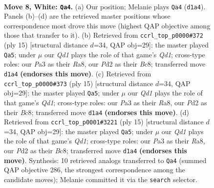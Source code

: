 \documentclass[11pt]{article}
\begin{document}
\begin{figure}[p]\centering
\begin{subfigure}{0.46\textwidth}\centering
\resizebox{\linewidth}{!}{%
\newchessgame
\chessboard[
  setfen={r1bq1rk1/pp1pppbp/2n3p1/2p4n/2P5/P1N2NP1/1P1PPPBP/R1BQ1RK1 w - - 1 8},
  showmover=false,
  pgfstyle=straightmove, color=movearrow, markmove={d1-a4}
]}
\caption{}
\end{subfigure}\hfill
\begin{subfigure}{0.46\textwidth}\centering
\resizebox{\linewidth}{!}{%
\newchessgame
\chessboard[
  setfen={r1bq1rk1/pp1pppbp/2n2np1/8/2PN4/2N3P1/PP2PPBP/R1BQ1RK1 b - - 6 8},
  showmover=false,
  pgfstyle=straightmove, color=movearrow, markmove={d8-a5}
]}
\caption{}
\end{subfigure}
\\[4pt]
\begin{subfigure}{0.46\textwidth}\centering
\resizebox{\linewidth}{!}{%
\newchessgame
\chessboard[
  setfen={r1bq1rk1/pp1pppbp/2n2np1/8/2PN4/2N3P1/PP2PPBP/R1BQ1RK1 b - - 6 8},
  showmover=false,
  pgfstyle=straightmove, color=movearrow, markmove={d8-a5}
]}
\caption{}
\end{subfigure}\hfill
\begin{subfigure}{0.46\textwidth}\centering
\resizebox{\linewidth}{!}{%
\newchessgame
\chessboard[
  setfen={r1bq1rk1/pp1pppbp/2n2np1/8/2PN4/2N3P1/PP2PPBP/R1BQ1RK1 b - - 4 8},
  showmover=false,
  pgfstyle=straightmove, color=movearrow, markmove={d8-a5}
]}
\caption{}
\end{subfigure}
\caption{\textbf{Move 8, White: \texttt{Qa4}.} (a) Our position; Melanie plays \texttt{Qa4} (\texttt{d1a4}). Panels (b)--(d) are the retrieved master positions whose correspondence most drove this move (highest QAP objective among those that transfer to it). (b) Retrieved from \texttt{ccrl\_top\_p0000\#372} (ply 15) [structural distance $d$=34, QAP obj=29]: the master played \texttt{Qa5}; under $\mu$ our \emph{Qd1} plays the role of that game's \emph{Qd1}; cross-type roles: our \emph{P}a3 as their \emph{R}a8, our \emph{P}d2 as their \emph{B}c8; transferred move \texttt{d1a4} \textbf{(endorses this move)}. (c) Retrieved from \texttt{ccrl\_top\_p0000\#373} (ply 15) [structural distance $d$=34, QAP obj=29]: the master played \texttt{Qa5}; under $\mu$ our \emph{Qd1} plays the role of that game's \emph{Qd1}; cross-type roles: our \emph{P}a3 as their \emph{R}a8, our \emph{P}d2 as their \emph{B}c8; transferred move \texttt{d1a4} \textbf{(endorses this move)}. (d) Retrieved from \texttt{ccrl\_top\_p0001\#3221} (ply 15) [structural distance $d$=34, QAP obj=29]: the master played \texttt{Qa5}; under $\mu$ our \emph{Qd1} plays the role of that game's \emph{Qd1}; cross-type roles: our \emph{P}a3 as their \emph{R}a8, our \emph{P}d2 as their \emph{B}c8; transferred move \texttt{d1a4} \textbf{(endorses this move)}. Synthesis: 10 retrieved analogs transferred to \texttt{Qa4} (summed QAP objective 286, the strongest correspondence among the candidate moves); Melanie committed it via the \texttt{search} selector.}
\label{fig:thought-m14}
\end{figure}
\end{document}
